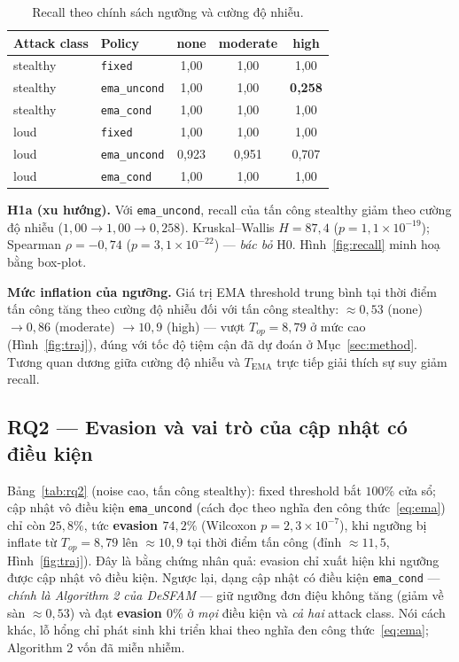\begin{table}[ht]
\caption{Recall theo chính sách ngưỡng và cường độ nhiễu.}
\label{tab:full}
\centering
\begin{tabular}{@{}llccc@{}}
\toprule
\textbf{Attack class} & \textbf{Policy} & \textbf{none} & \textbf{moderate} & \textbf{high} \\
\midrule
stealthy & \texttt{fixed}      & 1{,}00 & 1{,}00 & 1{,}00 \\
stealthy & \texttt{ema\_uncond}& 1{,}00 & 1{,}00 & \textbf{0{,}258} \\
stealthy & \texttt{ema\_cond}  & 1{,}00 & 1{,}00 & 1{,}00 \\
\midrule
loud & \texttt{fixed}      & 1{,}00 & 1{,}00 & 1{,}00 \\
loud & \texttt{ema\_uncond}& 0{,}923 & 0{,}951 & 0{,}707 \\
loud & \texttt{ema\_cond}  & 1{,}00 & 1{,}00 & 1{,}00 \\
\bottomrule
\end{tabular}
\end{table}

\textbf{H1a (xu hướng).} Với \texttt{ema\_uncond}, recall của tấn công stealthy giảm theo cường độ nhiễu ($1{,}00 \to 1{,}00 \to 0{,}258$). Kruskal--Wallis $H=87{,}4$ ($p=1{,}1\times10^{-19}$); Spearman $\rho=-0{,}74$ ($p=3{,}1\times10^{-22}$) — \textit{bác bỏ} H0. Hình~\ref{fig:recall} minh hoạ bằng box-plot.

\textbf{Mức inflation của ngưỡng.} Giá trị EMA threshold trung bình tại thời điểm tấn công tăng theo cường độ nhiễu đối với tấn công stealthy: $\approx 0{,}53$ (none) $\to 0{,}86$ (moderate) $\to 10{,}9$ (high) — vượt $T_{op}=8{,}79$ ở mức cao (Hình~\ref{fig:traj}), đúng với tốc độ tiệm cận đã dự đoán ở Mục~\ref{sec:method}. Tương quan dương giữa cường độ nhiễu và $T_{\text{EMA}}$ trực tiếp giải thích sự suy giảm recall.

\subsection{RQ2 — Evasion và vai trò của cập nhật có điều kiện}
Bảng~\ref{tab:rq2} (noise cao, tấn công stealthy): fixed threshold bắt $100\%$ cửa sổ; cập nhật vô điều kiện \texttt{ema\_uncond} (cách đọc theo nghĩa đen công thức~\eqref{eq:ema}) chỉ còn $25{,}8\%$, tức \textbf{evasion $74{,}2\%$} (Wilcoxon $p=2{,}3\times10^{-7}$), khi ngưỡng bị inflate từ $T_{op}=8{,}79$ lên $\approx10{,}9$ tại thời điểm tấn công (đỉnh $\approx11{,}5$, Hình~\ref{fig:traj}). Đây là bằng chứng nhân quả: evasion chỉ xuất hiện khi ngưỡng được cập nhật vô điều kiện. Ngược lại, dạng cập nhật có điều kiện \texttt{ema\_cond} — \textit{chính là Algorithm 2 của DeSFAM} — giữ ngưỡng đơn điệu không tăng (giảm về sàn $\approx0{,}53$) và đạt \textbf{evasion $0\%$} ở \textit{mọi} điều kiện và \textit{cả hai} attack class. Nói cách khác, lỗ hổng chỉ phát sinh khi triển khai theo nghĩa đen công thức~\eqref{eq:ema}; Algorithm 2 vốn đã miễn nhiễm.

